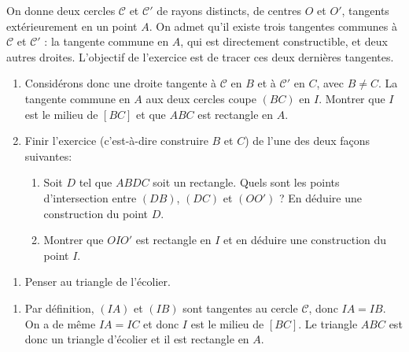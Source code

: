 \begin{exo}
On donne deux cercles $\mathcal C$ et $\mathcal C'$ de rayons distincts, de centres $O$ et $O'$, tangents extérieurement en  un point $A$. On admet qu'il existe trois tangentes communes  à $\mathcal C$ et $\mathcal C'$ : la tangente commune en $A$, qui est directement constructible, et deux autres droites. L'objectif de l'exercice est de tracer ces deux dernières tangentes. 
\begin{enumerate}

\item Considérons donc une droite tangente à $\mathcal C$ en $B$ et à $\mathcal C'$ en $C$, avec $B\neq C$. La tangente commune en $A$ aux deux cercles coupe $(BC)$ en $I$. Montrer que $I$ est le milieu de $[BC]$ et que $ABC$ est rectangle en $A$.
\item Finir l'exercice (c'est-à-dire construire $B$ et $C$) de l'une des deux façons suivantes:
\begin{enumerate}
\item Soit $D$ tel que $ABDC$ soit un rectangle. Quels sont les points d'intersection entre $(DB)$, $(DC)$ et $(OO')$ ? En déduire une construction du point $D$.
\item Montrer que $OIO'$ est rectangle en $I$ et en déduire une construction du point $I$.
\end{enumerate}
\end{enumerate}

\begin{hint}   
\begin{enumerate}
\item Penser au triangle de l'écolier.
\end{enumerate}
\end{hint}      
\begin{sol} 
\begin{enumerate}
\item Par définition, $(IA)$ et $(IB)$ sont tangentes au cercle $\mathcal C$, donc $IA=IB$. On a de même $IA=IC$ et donc $I$ est le milieu de $[BC]$. Le triangle $ABC$ est donc un triangle d'écolier et il est rectangle en $A$.
\end{enumerate}
\end{sol}  
\end{exo}  


